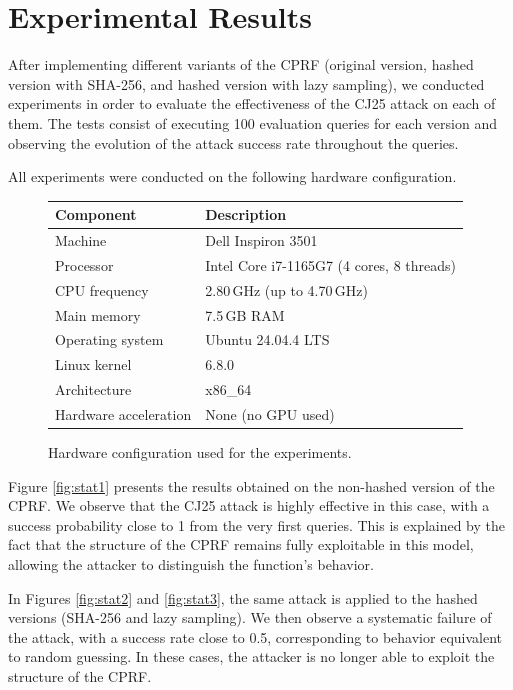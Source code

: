 \documentclass[9pt]{extarticle}
\begin{document}
\section{Experimental Results}

After implementing different variants of the CPRF (original version, hashed version with SHA-256, and hashed version with lazy sampling), 
we conducted experiments in order to evaluate the effectiveness of the CJ25 attack on each of them. 
The tests consist of executing 100 evaluation queries for each version and observing the evolution of the attack success rate throughout the queries.

All experiments were conducted on the following hardware configuration.

\begin{figure}[h]
\centering
\begin{tabular}{ll}
\hline
\textbf{Component} & \textbf{Description} \\
\hline
Machine & Dell Inspiron 3501 \\
Processor & Intel Core i7-1165G7 (4 cores, 8 threads) \\
CPU frequency & 2.80\,GHz (up to 4.70\,GHz) \\
Main memory & 7.5\,GB RAM \\
Operating system & Ubuntu 24.04.4 LTS \\
Linux kernel & 6.8.0 \\
Architecture & x86\_64 \\
Hardware acceleration & None (no GPU used) \\
\hline
\end{tabular}

\caption{Hardware configuration used for the experiments.}
\label{fig:setup}
\end{figure}

Figure \ref{fig:stat1} presents the results obtained on the non-hashed version of the CPRF. 
We observe that the CJ25 attack is highly effective in this case, with a success probability close to 1 from the very first queries. 
This is explained by the fact that the structure of the CPRF remains fully exploitable in this model, allowing the attacker to distinguish the function's behavior.

In Figures \ref{fig:stat2} and \ref{fig:stat3}, the same attack is applied to the hashed versions (SHA-256 and lazy sampling). We then observe a systematic failure of the attack, with a success rate close to 0.5, corresponding to behavior equivalent to random guessing. In these cases, the attacker is no longer able to exploit the structure of the CPRF.
\end{document}
